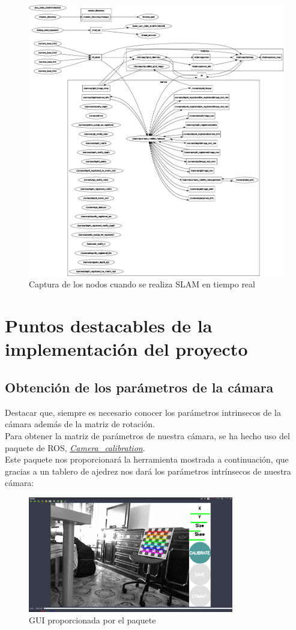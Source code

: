 \begin{figure}[!ht]
    \centering
    \includegraphics[width=.8\textwidth]{images/rqt_graphs/rpi_onboardSLAM.pdf}
    \caption{Captura de los nodos cuando se realiza SLAM en tiempo real}
    \label{rqt01}
\end{figure}

\section{Puntos destacables de la implementación del proyecto}

\subsection{Obtención de los parámetros de la cámara}
Destacar que, siempre es necesario conocer los parámetros intrinsecos de la cámara además de la matriz de rotación. \\
Para obtener la matriz de parámetros de nuestra cámara, se ha hecho uso del paquete de ROS, \textit{\href{http://wiki.ros.org/camera_calibration}{Camera\_calibration}}.\\
Este paquete nos proporcionará la herramienta mostrada a continuación, que gracias a un tablero de ajedrez nos dará los parámetros intrínsecos de nuestra cámara:
\begin{figure}[!ht]
    \centering
    \includegraphics[width=0.8\textwidth]{images/calibration_art}
    \caption{GUI proporcionada por el paquete}
\end{figure}

